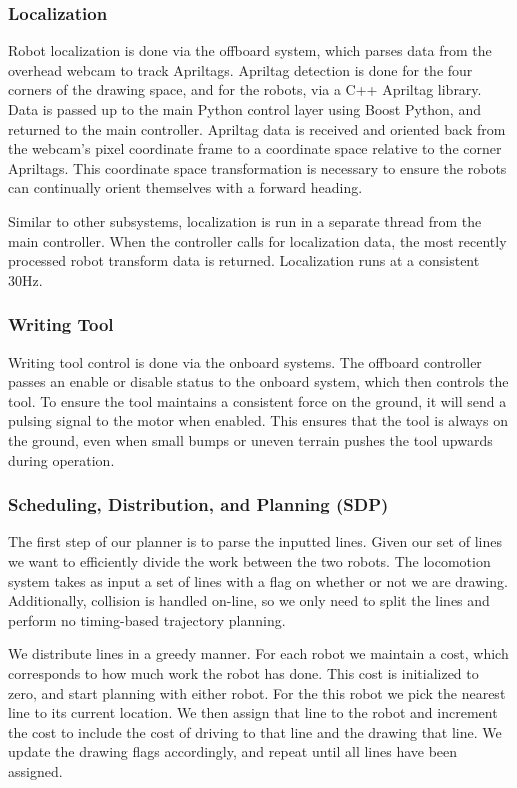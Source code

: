 \subsubsection{Localization}
\label{sec:sw_localization}
Robot localization is done via the offboard system, which parses data from the overhead webcam to track Apriltags. Apriltag detection is done for the four corners of the drawing space, and for the robots, via a C++ Apriltag library. Data is passed up to the main Python control layer using Boost Python, and returned to the main controller. Apriltag data is received and oriented back from the webcam's pixel coordinate frame to a coordinate space relative to the corner Apriltags. This coordinate space transformation is necessary to ensure the robots can continually orient themselves with a forward heading.

Similar to other subsystems, localization is run in a separate thread from the main controller. When the controller calls for localization data, the most recently processed robot transform data is returned. Localization runs at a consistent 30Hz.

\subsubsection{Writing Tool}
\label{sec:sw_writing}
Writing tool control is done via the onboard systems. The offboard controller passes an enable or disable status to the onboard system, which then controls the tool. To ensure the tool maintains a consistent force on the ground, it will send a pulsing signal to the motor when enabled. This ensures that the tool is always on the ground, even when small bumps or uneven terrain pushes the tool upwards during operation.

\subsubsection{Scheduling, Distribution, and Planning (SDP)}
\label{sec:sw_sdp}

The first step of our planner is to parse the inputted lines.
Given our set of lines we want to efficiently divide the work between the two robots.
The locomotion system takes as input a set of lines with a flag on whether or not we are drawing.
Additionally, collision is handled on-line, so we only need to split the lines and perform no timing-based trajectory planning.

We distribute lines in a greedy manner.
For each robot we maintain a cost, which corresponds to how much work the robot has done.
This cost is initialized to zero, and start planning with either robot.
For the this robot we pick the nearest line to its current location.
We then assign that line to the robot and increment the cost to include the cost of driving to that line and the drawing that line.
We update the drawing flags accordingly, and repeat until all lines have been assigned.


